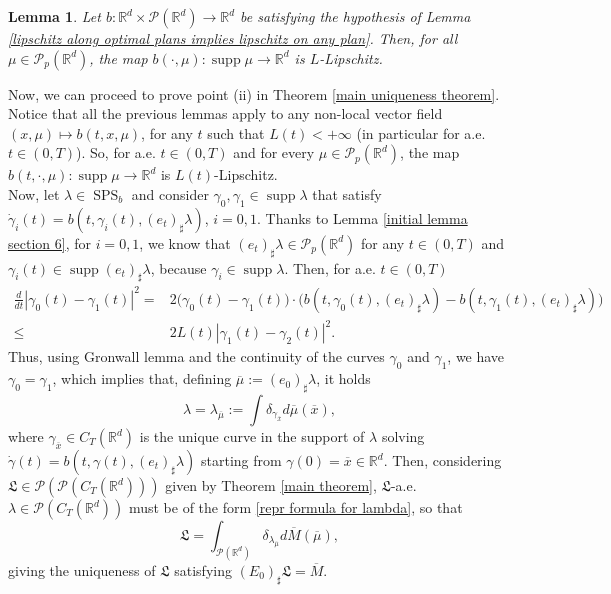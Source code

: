\documentclass[10pt,leqno]{amsart}
\numberwithin{equation}{section}
\newtheorem{lemma}[teorema]{Lemma}
\newcommand{\R}{\mathbb{R}}
\newcommand{\PP}{\mathcal{P}}
\begin{document}
    \begin{lemma}\label{W_p lipschitz implies spatial lipschitz}
        Let $b:\R^d\times \PP(\R^d)\to\R^d$ be satisfying the hypothesis of Lemma \ref{lipschitz along optimal plans implies lipschitz on any plan}. Then, for all $\mu\in \PP_p(\R^d)$, the map $b(\cdot,\mu) :\operatorname{supp}\mu \to \R^d$ is $L$-Lipschitz.
    \end{lemma}

    Now, we can proceed to prove point (ii) in Theorem \ref{main uniqueness theorem}. Notice that all the previous lemmas apply to any non-local vector field $(x,\mu)\mapsto b(t,x,\mu)$, for any $t$ such that $L(t)<+\infty$ (in particular for a.e. $t\in (0,T)$). So, for a.e. $t\in(0,T)$ and for every $\mu\in \PP_p(\R^d)$, the map $b(t,\cdot,\mu) : \operatorname{supp}\mu \to \R^d$ is $L(t)$-Lipschitz.
    \\
    Now, let $\lambda \in \operatorname{SPS}_b$ and consider $\gamma_0,\gamma_1\in \operatorname{supp}\lambda$ that satisfy $\dot\gamma_i(t) = b(t,\gamma_i(t),(e_t)_\sharp \lambda)$, $i=0,1$. Thanks to Lemma \ref{initial lemma section 6}, for $i=0,1$, we know that $(e_t)_\sharp \lambda \in \PP_p(\R^d)$ for any $t\in (0,T)$ and $\gamma_i(t) \in \operatorname{supp}(e_t)_\sharp \lambda$, because $\gamma_i\in \operatorname{supp}\lambda$. Then, for a.e. $t\in (0,T)$
    \begin{align*}
        \frac{d}{dt} |\gamma_0(t) - \gamma_1(t)|^2 = & 2\big(\gamma_0(t) - \gamma_1(t)\big)\cdot \big(b(t,\gamma_0(t),(e_t)_\sharp \lambda) - b(t,\gamma_1(t),(e_t)_\sharp \lambda )\big)
        \\
        \leq &
        2L(t)|\gamma_1(t) - \gamma_2(t)|^2.
    \end{align*}
    Thus, using Gronwall lemma and the continuity of the curves $\gamma_0$ and $\gamma_1$, we have $\gamma_0 = \gamma_1$, which implies that, defining $\overline{\mu}:= (e_0)_\sharp \lambda$, it holds
    \begin{equation}\label{repr formula for lambda}
        \lambda = \lambda_{\overline{\mu}} := \int \delta_{\gamma_{\overline{x}}} d\overline{\mu}(\overline{x}),
    \end{equation}
    where $\gamma_{\overline{x}}\in C_T(\R^d)$ is the unique curve in the support of $\lambda$ solving $\dot{\gamma}(t) = b(t,\gamma(t),(e_t)_\sharp \lambda)$ starting from $\gamma(0) = \overline{x} \in \R^d$. 
    Then, considering $\mathfrak{L}\in \PP(\PP(C_T(\R^d)))$ given by Theorem \ref{main theorem}, $\mathfrak{L}$-a.e. $\lambda \in \PP(C_T(\R^d))$ must be of the form \eqref{repr formula for lambda}, so that 
    \begin{equation}
        \mathfrak{L} = \int_{\PP(\R^d)} \delta_{\lambda_{\overline{\mu}}} d\overline{M}(\overline{\mu}),
    \end{equation}
    giving the uniqueness of $\mathfrak{L}$ satisfying $(E_0)_\sharp \mathfrak{L} = \overline{M}$.
\end{document}
